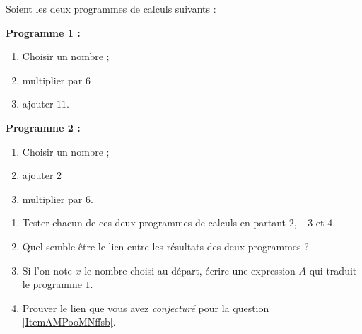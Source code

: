 
\begin{exercice}\label{exosmath-0895}

Soient les deux programmes de calculs suivants :

\begin{framed}
    {\bf Programme 1 :}
\begin{enumerate}
    \item
 Choisir un nombre ;
\item
    multiplier par \( 6\)
\item
    ajouter \( 11\).
\end{enumerate}
\end{framed}
\begin{framed}
    {\bf Programme 2 :}
\begin{enumerate}
    \item
 Choisir un nombre ;
    \item
        ajouter \( 2\)
    \item
        multiplier par \( 6\).
\end{enumerate}
\end{framed}

\begin{enumerate}
    \item
 Tester chacun de ces deux programmes de calculs en partant $2$, $-3$ et $4$.
\item   \label{ItemAMPooMNffsb}
    Quel semble être le lien entre les résultats des deux programmes ?
\item
    Si l'on note $x$ le nombre choisi au départ, écrire une expression $A$ qui traduit le programme $1$.
\item
    Prouver le lien que vous avez \emph{conjecturé} pour la question \ref{ItemAMPooMNffsb}.
\end{enumerate}

\end{exercice}
